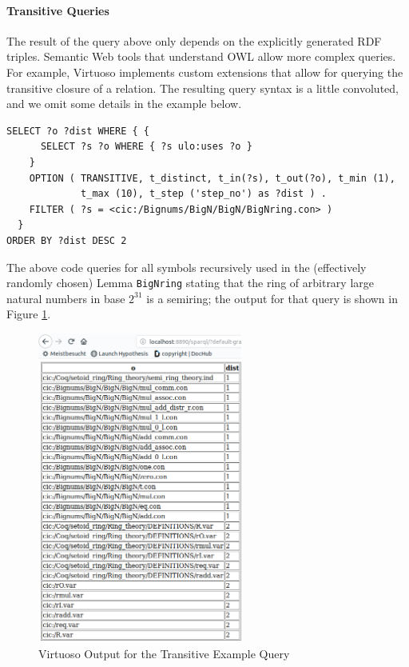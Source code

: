 
\paragraph{Transitive Queries} The result of the query above only depends on the explicitly generated RDF triples. Semantic Web tools that understand OWL allow more complex queries. %
For example, Virtuoso implements custom extensions that allow for querying the transitive closure of a relation. The resulting query syntax is a little convoluted, and we omit some details in the example below.
\begin{lstlisting}
SELECT ?o ?dist WHERE { {
      SELECT ?s ?o WHERE { ?s ulo:uses ?o }
    }
    OPTION ( TRANSITIVE, t_distinct, t_in(?s), t_out(?o), t_min (1),
             t_max (10), t_step ('step_no') as ?dist ) .
    FILTER ( ?s = <cic:/Bignums/BigN/BigN/BigNring.con> )
  }
ORDER BY ?dist DESC 2
\end{lstlisting}
The above code queries for all symbols recursively used in the (effectively randomly chosen) Lemma \texttt{BigNring} stating that the ring of arbitrary large natural numbers in base $2^{31}$ is a semiring; the output for that query is shown in Figure \ref{fig:query2}.


\begin{figure}[ht]\centering
\includegraphics[width=0.6\textwidth]{ulo_queryresult2}
\caption{Virtuoso Output for the Transitive Example Query}\label{fig:query2}
\end{figure}

